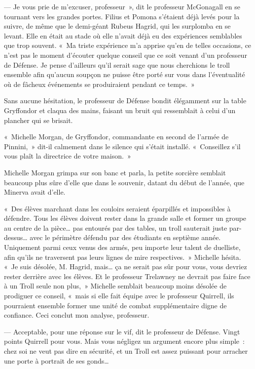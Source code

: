 --- Je vous prie de m'excuser, professeur~», dit le professeur McGonagall en se tournant vers les grandes portes. Filius et Pomona s'étaient déjà levés pour la suivre, de même que le demi-géant Rubeus Hagrid, qui les surplomba en se levant. Elle en était au stade où elle n'avait déjà eu des expériences semblables que trop souvent. «~Ma triste expérience m'a apprise qu'en de telles occasions, ce n'est pas le moment d'écouter quelque conseil que ce soit venant d'un professeur de Défense. Je pense d'ailleurs qu'il serait sage que nous cherchions le troll ensemble afin qu'aucun soupçon ne puisse être porté sur vous dans l'éventualité où de fâcheux événements se produiraient pendant ce temps.~»

Sans aucune hésitation, le professeur de Défense bondit élégamment sur la table Gryffondor et claqua des mains, faisant un bruit qui ressemblait à celui d'un plancher qui se brisait.

«~Michelle Morgan, de Gryffondor, commandante en second de l'armée de Pinnini,~» dit-il calmement dans le silence qui s'était installé. «~Conseillez s'il vous plaît la directrice de votre maison.~»

Michelle Morgan grimpa sur son banc et parla, la petite sorcière semblait beaucoup plus sûre d'elle que dans le souvenir, datant du début de l'année, que Minerva avait d'elle.

«~Des élèves marchant dans les couloirs seraient éparpillés et impossibles à défendre. Tous les élèves doivent rester dans la grande salle et former un groupe au centre de la pièce… pas entourés par des tables, un troll sauterait juste par-dessus… avec le périmètre défendu par des étudiants en septième année. Uniquement parmi ceux venus des armés, peu importe leur talent de duelliste, afin qu'ils ne traversent pas leurs lignes de mire respectives.~» Michelle hésita. «~Je suis désolée, M. Hagrid, mais… ça ne serait pas sûr pour vous, vous devriez rester derrière avec les élèves. Et le professeur Trelawney ne devrait pas faire face à un Troll seule non plus,~» Michelle semblait beaucoup moins désolée de prodiguer ce conseil, «~mais si elle fait équipe avec le professeur Quirrell, ils pourraient ensemble former une unité de combat supplémentaire digne de confiance. Ceci conclut mon analyse, professeur.

--- Acceptable, pour une réponse sur le vif, dit le professeur de Défense. Vingt points Quirrell pour vous. Mais vous négligez un argument encore plus simple~: chez soi ne veut pas dire en sécurité, et un Troll est assez puissant pour arracher une porte à portrait de ses gonds…

